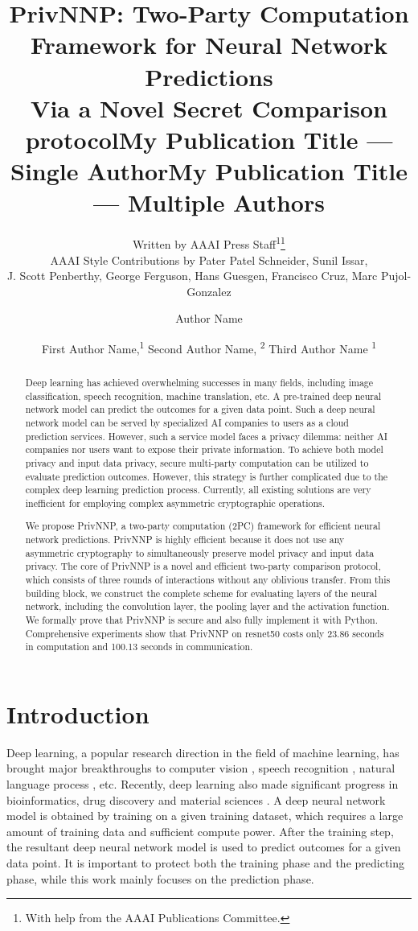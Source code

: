 \documentclass[letterpaper]{article} %
\title{PrivNNP: Two-Party Computation Framework for Neural Network Predictions \\ Via a Novel Secret Comparison protocol}
\author{
    Written by AAAI Press Staff\textsuperscript{\rm 1}\thanks{With help from the AAAI Publications Committee.}\\
    AAAI Style Contributions by Pater Patel Schneider,
    Sunil Issar,\\
    J. Scott Penberthy,
    George Ferguson,
    Hans Guesgen,
    Francisco Cruz\equalcontrib,
    Marc Pujol-Gonzalez\equalcontrib
}
\title{My Publication Title --- Single Author}
\author {
    Author Name
}
\title{My Publication Title --- Multiple Authors}
\author {
    First Author Name,\textsuperscript{\rm 1}
    Second Author Name, \textsuperscript{\rm 2}
    Third Author Name \textsuperscript{\rm 1}
}
\begin{document}
\maketitle

\begin{abstract}

    Deep learning has achieved overwhelming successes in many fields, including image classification, speech recognition, machine translation, etc.
    A pre-trained deep neural network model can predict the outcomes
    for a given data point. Such a deep neural network model can be served by
    specialized AI companies to users as a cloud prediction services.
    However, such a service model faces a privacy dilemma: neither AI companies nor
    users want to expose their private information.
    To achieve both model privacy and input data privacy,
    secure multi-party computation can be utilized to evaluate prediction outcomes. However,
    this strategy is further complicated due to the complex deep learning prediction process.
    Currently, all existing solutions are very inefficient for employing complex asymmetric cryptographic operations.

    We propose PrivNNP, a two-party computation (2PC) framework for efficient neural network predictions.
    PrivNNP is highly efficient because it does not use any asymmetric cryptography to simultaneously preserve model privacy and input data privacy.
    The core of PrivNNP is a novel and efficient two-party comparison protocol,
    which consists of three rounds of interactions without any oblivious transfer.
    From this building block, we construct the complete scheme for evaluating layers of the neural network, including the convolution layer, the pooling layer and the activation function.
	We formally prove that PrivNNP is secure and also fully implement it with Python.
    Comprehensive experiments show that PrivNNP on resnet50
    costs only 23.86 seconds in computation and 100.13 seconds in communication.


\end{abstract}


\section{Introduction}



    \noindent Deep learning, a popular research direction in the field of machine learning,
    has brought major breakthroughs to computer vision \cite{ComputerVision},
    speech recognition \cite{SpeechRecognition}, natural language process \cite{NLP}, etc.
    Recently, deep learning also made significant progress in bioinformatics,
    drug discovery \cite{DrugDiscovery} and material sciences \cite{material}.
    A deep neural network model is obtained by training on
	a given training dataset, which requires a large amount of training data and sufficient compute power.
	After the training step, the resultant deep neural network model is used to predict
	outcomes for a given data point. It is important to protect both the training phase and the predicting phase,
    while this work mainly focuses on the prediction phase.
\end{document}
